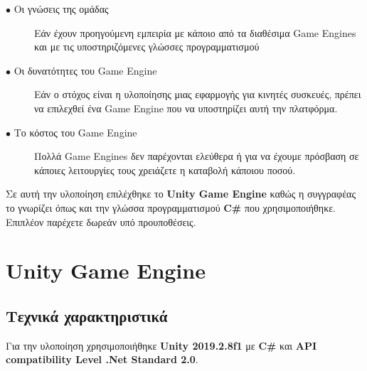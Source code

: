 \begin{description}
\item[$\bullet$ Οι γνώσεις της ομάδας] Εάν έχουν προηγούμενη εμπειρία με κάποιο από τα διαθέσιμα Game Engines και με τις υποστηριζόμενες γλώσσες προγραμματισμού
\item[$\bullet$ Οι δυνατότητες του Game Engine] Εάν ο στόχος είναι η υλοποίησης μιας εφαρμογής για κινητές συσκευές, πρέπει να επιλεχθεί ένα Game Engine που να υποστηρίζει αυτή την πλατφόρμα.
\item[$\bullet$ Το κόστος του Game Engine] Πολλά Game Engines δεν παρέχονται ελεύθερα ή για να έχουμε πρόσβαση σε κάποιες λειτουργίες τους χρειάζετε η καταβολή κάποιου ποσού.
\end{description}

\par
Σε αυτή την υλοποίηση επιλέχθηκε το \textbf{Unity Game Engine} καθώς η συγγραφέας το γνωρίζει όπως και την γλώσσα προγραμματισμού \textbf{C\#} που χρησιμοποιήθηκε. Επιπλέον παρέχετε δωρεάν υπό προυποθέσεις.


\section{Unity Game Engine}

\subsection{Τεχνικά χαρακτηριστικά}
Για την υλοποίηση χρησιμοποιήθηκε \textbf{Unity 2019.2.8f1} με \textbf{C\#} και \textbf{API compatibility Level .Net Standard 2.0}. 

